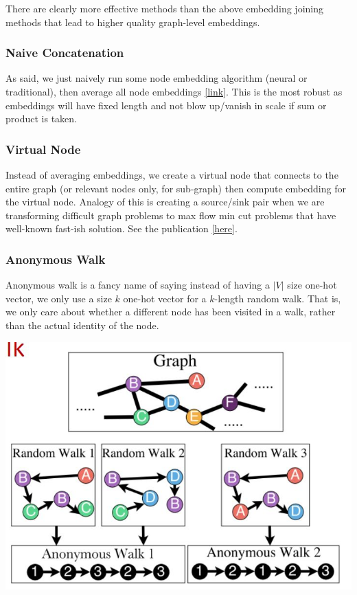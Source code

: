 There are clearly more effective methods than the above embedding joining methods that lead to higher quality graph-level embeddings.

\subsubsection{Naive Concatenation}

As said, we just naively run some node embedding algorithm (neural or traditional), then average all node embeddings \href{https://arxiv.org/pdf/1509.09292.pdf}{[link]}. This is the most robust as embeddings will have fixed length and not blow up/vanish in scale if sum or product is taken. 

\subsubsection{Virtual Node}

Instead of averaging embeddings, we create a virtual node that connects to the entire graph (or relevant nodes only, for sub-graph) then compute embedding for the virtual node. Analogy of this is creating a source/sink pair when we are transforming difficult graph problems to max flow min cut problems that have well-known fast-ish solution. See the publication \href{https://arxiv.org/abs/1511.05493}{[here]}.

\subsubsection{Anonymous Walk}

Anonymous walk is a fancy name of saying instead of having a $|V|$ size one-hot vector, we only use a size $k$ one-hot vector for a $k$-length random walk. That is, we only care about whether a different node has been visited in a walk, rather than the actual identity of the node. 

{
\centering
\includegraphics[width=0.55\linewidth]{notes/img/l7_p58_anonymous.JPG} \par
}

